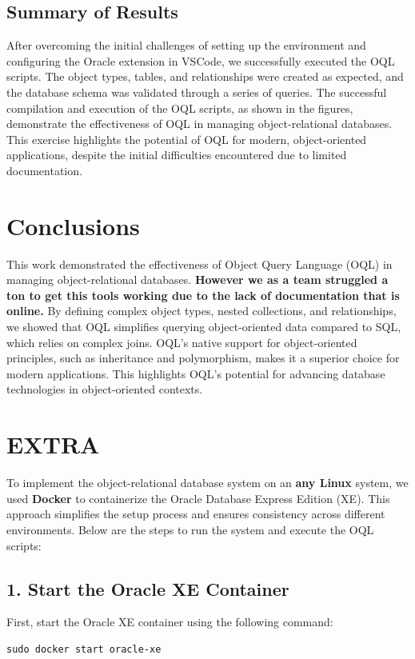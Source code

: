 \documentclass{article}
\begin{document}
\subsection*{Summary of Results}
After overcoming the initial challenges of setting up the environment and configuring the Oracle extension in VSCode, we successfully executed the OQL scripts. The object types, tables, and relationships were created as expected, and the database schema was validated through a series of queries. The successful compilation and execution of the OQL scripts, as shown in the figures, demonstrate the effectiveness of OQL in managing object-relational databases. This exercise highlights the potential of OQL for modern, object-oriented applications, despite the initial difficulties encountered due to limited documentation.

\section{Conclusions}
This work demonstrated the effectiveness of Object Query Language (OQL) in managing object-relational databases. \textbf{However we as a team struggled a ton to get this tools working due to the lack of documentation that is online.} By defining complex object types, nested collections, and relationships, we showed that OQL simplifies querying object-oriented data compared to SQL, which relies on complex joins. OQL's native support for object-oriented principles, such as inheritance and polymorphism, makes it a superior choice for modern applications. This highlights OQL's potential for advancing database technologies in object-oriented contexts.

\section{EXTRA}

To implement the object-relational database system on an \textbf{any Linux} system, we used \textbf{Docker} to containerize the Oracle Database Express Edition (XE). This approach simplifies the setup process and ensures consistency across different environments. Below are the steps to run the system and execute the OQL scripts:

\subsection*{1. Start the Oracle XE Container}
First, start the Oracle XE container using the following command:
\begin{verbatim}
sudo docker start oracle-xe
\end{verbatim}
\end{document}
